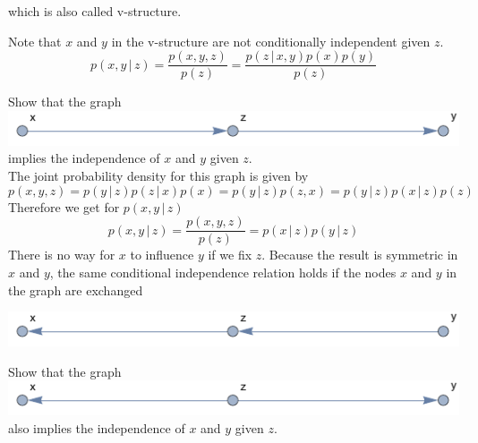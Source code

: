 \documentclass{tstextbook}
\begin{document}
which is also called v-structure.

\begin{remark}
Note that $x$ and $y$ in the v-structure are not conditionally independent given $z$.
\begin{equation}
p(x,y\,\vert\,z)=\frac{p(x,y,z)}{p(z)}=\frac{p(z\,\vert\, x,y)p(x)p(y)}{p(z)}
\end{equation}
\end{remark}

\begin{example}
\label{ex:chain_graph}
Show that the graph
 \includegraphics[scale=0.8, left]{images/graph_example.pdf}
 implies the independence of $x$ and $y$ given $z$.\\
 
 The joint probability density for this graph is given by
\begin{equation}
p(x,y,z)=p(y\,\vert\,z)p(z\,\vert\,x)p(x)=p(y\,\vert\,z)p(z,x)=p(y\,\vert\,z)p(x\,\vert\,z)p(z)
\end{equation}
Therefore we get for $p(x,y\,\vert\,z)$
\begin{equation}
p(x,y\,\vert\,z)=\frac{p(x,y,z)}{p(z)} = p(x\,\vert\,z)p(y\,\vert\,z)
\end{equation}
There is no way for $x$ to influence $y$ if we fix $z$. Because the result is symmetric in $x$ and $y$, the same conditional independence relation holds if the nodes $x$ and $y$ in the graph are exchanged

\includegraphics[scale=0.8, center]{images/equivalent_graph.pdf}   
\end{example}

\begin{exercise}
Show that the graph
\includegraphics[scale=0.8, left]{images/graph_exercise.pdf}
 also implies the independence of $x$ and $y$ given $z$.
\end{exercise}
\end{document}

